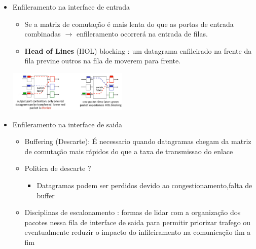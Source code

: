             \begin{itemize}[left=0.5cm, align=left, nosep]
                \item Enfileramento na interface de entrada
                    \begin{itemize}[left=0.5cm, nosep, label=$\hookrightarrow$]
                        \item Se a matriz de comutação é mais lenta do que as portas de entrada combinadas $\rightarrow$ enfileramento ocorrerá na entrada de filas. 
                        \item \textbf{Head of Lines} (HOL) blocking : um datagrama enfileirado na frente da fila previne outros na fila de moverem para frente.    
                    \end{itemize}
                     
                    \begin{center}
                        \includegraphics[width=0.45\textwidth]{img/cap-04/hol.png}
                    \end{center}

                \item Enfileramento na interface de saida
                    \begin{itemize}[left=0.5cm, nosep, label=$\hookrightarrow$]
                        \item Buffering (Descarte): É necessario quando datagramas chegam da matriz de comutação mais rápidos do que a taxa de transmissao do enlace 
                        
                        \item Politica de descarte ? 
                        \begin{itemize}[left=0.5cm, nosep, label=$-$]
                            \item Datagramas podem ser perdidos devido ao congestionamento,falta de buffer
                        \end{itemize}
                        
                        \item Disciplinas de escalonamento : formas de lidar com a organização dos pacotes nessa fila de interface de saida para permitir priorizar trafego ou eventualmente reduzir o impacto do infileiramento na comunicação fim a fim     
                       

\end{itemize}
\end{itemize}
